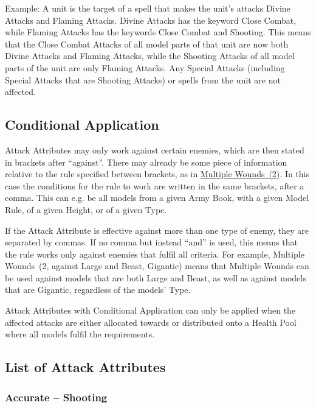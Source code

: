 Example: A unit is the target of a spell that makes the unit's attacks Divine Attacks and Flaming Attacks. Divine Attacks has the keyword Close Combat, while Flaming Attacks has the keywords Close Combat and Shooting. This means that the Close Combat Attacks of all model parts of that unit are now both Divine Attacks and Flaming Attacks, while the Shooting Attacks of all model parts of the unit are only Flaming Attacks. Any Special Attacks (including Special Attacks that are Shooting Attacks) or spells from the unit are not affected.

\subsection{Conditional Application}
\label{conditional_application}

Attack Attributes may only work against certain enemies, which are then stated in brackets after \enquote{against}. There may already be some piece of information relative to the rule specified between brackets, as in \hyperref[multiple_wounds]{Multiple Wounds~(2)}. In this case the conditions for the rule to work are written in the same brackets, after a comma. This can e.g. be all models from a given Army Book, with a given Model Rule, of a given Height, or of a given Type.

If the Attack Attribute is effective against more than one type of enemy, they are separated by commas. If no comma but instead \enquote{and} is used, this means that the rule works only against enemies that fulfil all criteria. For example, Multiple Wounds~(2, against Large and Beast, Gigantic) means that Multiple Wounds can be used against models that are both Large and Beast, as well as against models that are Gigantic, regardless of the models' Type.

Attack Attributes with Conditional Application can only be applied when the affected attacks are either allocated towards or distributed onto a Health Pool where all models fulfil the requirements.

\subsection{List of Attack Attributes}
\label{list_of_attack_attributes}

\subsubsection{Accurate -- Shooting}
\idx[main=y]{\accurate}\label{accurate}

